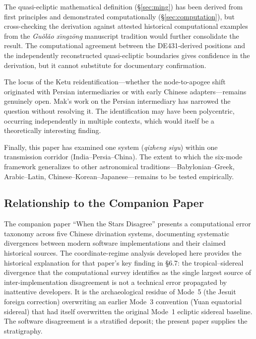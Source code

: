 \documentclass[10pt,a4paper]{article}
\begin{document}
The quasi-ecliptic mathematical definition (\S\ref{sec:ming}) has been derived from
first principles and demonstrated computationally (\S\ref{sec:computation}), but
cross-checking the derivation against attested historical computational
examples from the \textit{Gu\v{o}l\v{a}o x\={\i}ngz\={o}ng} manuscript tradition would further consolidate
the result.  The computational agreement between the DE431-derived positions
and the independently reconstructed quasi-ecliptic boundaries gives
confidence in the derivation, but it cannot substitute for documentary
confirmation.

The locus of the Ketu reidentification---whether the node-to-apogee shift
originated with Persian intermediaries or with early Chinese adapters---remains
genuinely open.  Mak's work on the Persian intermediary
\cite{mak2024persian} has narrowed the question without resolving it.  The
identification may have been polycentric, occurring independently in multiple
contexts, which would itself be a theoretically interesting finding.

Finally, this paper has examined one system (\textit{qizheng siyu}) within one
transmission corridor (India--Persia--China).  The extent to which the six-mode
framework generalizes to other astronomical traditions---Babylonian--Greek,
Arabic--Latin, Chinese--Korean--Japanese---remains to be tested empirically.

\subsection*{Relationship to the Companion Paper}

The companion paper ``When the Stars Disagree'' presents a computational error
taxonomy across five Chinese divination systems, documenting systematic
divergences between modern software implementations and their claimed historical
sources.  The coordinate-regime analysis developed here provides the historical
explanation for that paper's key finding in \S6.7: the tropical--sidereal
divergence that the computational survey identifies as the single largest source
of inter-implementation disagreement is not a technical error propagated by
inattentive developers.  It is the archaeological residue of Mode~5 (the Jesuit
foreign correction) overwriting an earlier Mode~3 convention (Yuan equatorial
sidereal) that had itself overwritten the original Mode~1 ecliptic sidereal
baseline.  The software disagreement is a stratified deposit; the present
paper supplies the stratigraphy.
\end{document}
